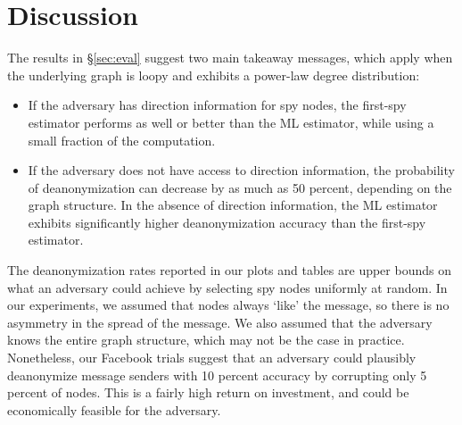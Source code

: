 \section{Discussion}

The results in \S\ref{sec:eval} suggest two main takeaway messages, which apply when the underlying graph is loopy and exhibits a power-law degree distribution:
\begin{itemize}
\item If the adversary has direction information for spy nodes, the first-spy estimator performs as well or better than the ML estimator, while using a small fraction of the computation.
\item If the adversary does not have access to direction information, the probability of deanonymization can decrease by as much as 50 percent, depending on the graph structure. In the absence of direction information, the ML estimator exhibits significantly higher deanonymization accuracy than the first-spy estimator.
\end{itemize} 

%

%

The deanonymization rates reported in our plots and tables are upper bounds on what an adversary could achieve by selecting spy nodes uniformly at random. In our experiments, we assumed that nodes always `like' the message, so there is no asymmetry in the spread of the message. We also assumed that the adversary knows the entire graph structure, which may not be the case in practice. Nonetheless, our Facebook trials suggest that an adversary could plausibly deanonymize message senders with 10 percent accuracy by corrupting only 5 percent of nodes. This is a fairly high return on investment, and could be economically feasible for the adversary. 

